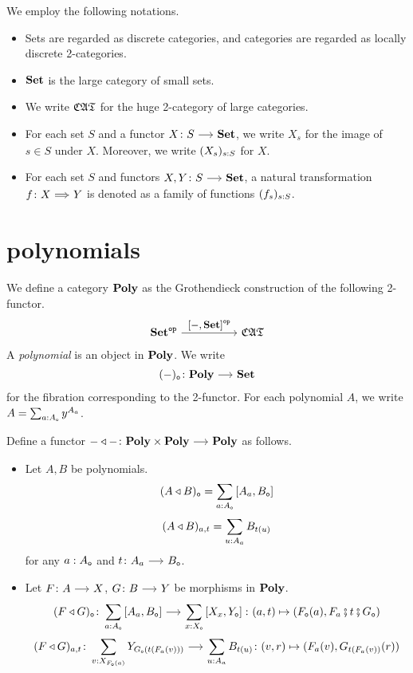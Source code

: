 \documentclass[a4paper,dvipsnames, 11pt]{amsart}
\begin{document}
\maketitle
\begin{notation}
	We employ the following notations.
	\begin{itemize}
		\item %
			Sets are regarded as discrete categories,
			and categories are regarded as locally discrete 2-categories.
		\item %
			$\mathbf{Set}$ is the large category of small sets.
		\item %
			We write ${\mathfrak{CAT}}$ for the huge 2-category of large categories.
		\item %
			For each set $S$ and a functor $X\colon S\arr\Set$,
			we write $X_s$ for the image of $s\in S$ under $X$.
			Moreover, we write $(X_s)_{s: S}$ for $X$.
		\item %
			For each set $S$ and functors $X,Y\colon S\arr \Set$,
			a natural transformation $f\colon X \arr[Rightarrow]Y$ is denoted as a family of functions
			$(f_s)_{s: S}$.
	\end{itemize}
\end{notation}
\section{polynomials}
\begin{definition}
	We define a category $\mathbf{Poly}$ as the Grothendieck construction of the following 2-functor.
	\[
		\Set^\op
		\arr"\left[-,\Set\right]^\op"[][5]
		\CATbi
	\]
	A \emph{polynomial} is an object in $\mathbf{Poly}$.
	We write
	\[
		(-)_\ob\colon\Poly\arr\Set
	\]
	for the fibration corresponding to the 2-functor.
	For each polynomial $A$,
	we write $A=\sum_{a: A_{\mathtt{o}}}y^{A_a}$.
\end{definition}
\begin{definition}
	Define a functor $-\trleft-\colon\Poly\times\Poly\arr\Poly$ as follows.
	\begin{itemize}
		\item %
			Let $A,B$ be polynomials.
			\[
				(A\triangleleft B)_{\mathtt{o}}
				=\sum_{a: A_{\mathtt{o}}}\left[A_a,B_{\mathtt{o}}\right]
			\]
			\[
				(A\triangleleft B)_{a,t}
				=\sum_{u: A_a} B_{t(u)}
			\]
		for any
		$a: A_{\mathtt{o}}$ and $t\colon A_a\arr B_\ob$.
		\item %
			Let $F\colon A\arr X$, $G\colon B\arr Y$ be morphisms in $\mathbf{Poly}$.
			\[
				(F\trleft G)_\ob
				\colon
				\sum_{a\tcolon A_\ob}\left[A_a,B_\ob\right]
				\arr
				\sum_{x\tcolon X_\ob}\left[X_x,Y_\ob\right]
				\colon
				(a,t)\mapsto\left(F_\ob(a),F_{a}\fatsemi t\fatsemi G_{\ob}\right)
			\]
			\[
				(F\trleft G)_{a,t}\colon
				\sum_{v\tcolon X_{F_\ob(a)}}Y_{G_\ob(t(F_{a}(v)))}
				\arr
				\sum_{u\tcolon A_{a}}B_{t(u)}
				\colon
				(v,r)
				\mapsto
				(F_a(v),G_{t(F_a(v))}(r))
			\]
		\qedhere %
	\end{itemize}
\end{definition}
\begin{definition}
\end{definition}



\end{document}

